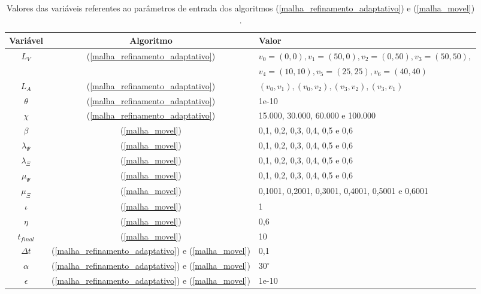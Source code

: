 \begin{table}[!h!t!b]
\centering
\vspace*{11pt}
 \begin{tabularx}{\textwidth}{c c X}
\hline
Variável & Algoritmo & Valor \\
\hline
$L_V$             & (\ref{malha_refinamento_adaptativo}) & {\small $v_0 = (0,0), v_1 = (50,0), v_2 = (0,50), v_3 = (50,50),$} \\
                  &                                      & {\small $v_4 = (10,10), v_5 = (25,25), v_6 = (40,40)$}\\
$L_A$             & (\ref{malha_refinamento_adaptativo}) & $(v_0, v_1), (v_0,v_2), (v_3,v_2), (v_3, v_1)$ \\
$\theta$          & (\ref{malha_refinamento_adaptativo}) & 1e-10 \\
$\chi$            & (\ref{malha_refinamento_adaptativo}) & 15.000, 30.000, 60.000 e 100.000 \\
$\beta$           & (\ref{malha_movel}) & 0,1, 0,2, 0,3, 0,4, 0,5 e 0,6 \\
$\lambda_{\Psi}$  & (\ref{malha_movel}) & 0,1, 0,2, 0,3, 0,4, 0,5 e 0,6 \\
$\lambda_{\Xi}$   & (\ref{malha_movel}) & 0,1, 0,2, 0,3, 0,4, 0,5 e 0,6 \\
$\mu_{\Psi}$      & (\ref{malha_movel}) & 0,1, 0,2, 0,3, 0,4, 0,5 e 0,6 \\
$\mu_{\Xi}$       & (\ref{malha_movel}) & 0,1001, 0,2001, 0,3001, 0,4001, 0,5001 e 0,6001\\
$\iota$           & (\ref{malha_movel}) & 1 \\
$\eta$            & (\ref{malha_movel}) & 0,6 \\
$t_{final}$       & (\ref{malha_movel}) & 10 \\
$\Delta t$        & (\ref{malha_refinamento_adaptativo}) e (\ref{malha_movel}) & 0,1 \\
$\alpha$          & (\ref{malha_refinamento_adaptativo}) e (\ref{malha_movel}) & $30^{\circ}$\\
$\epsilon$        & (\ref{malha_refinamento_adaptativo}) e (\ref{malha_movel}) & 1e-10\\
\hline %
\end{tabularx}
\caption{Valores das variáveis referentes ao parâmetros de entrada dos algoritmos (\ref{malha_refinamento_adaptativo}) e (\ref{malha_movel}) .} %
\label{tabelaValorParametros}
\end{table}


